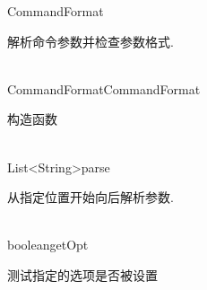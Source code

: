 \begin{XeClass}{CommandFormat}
   
 解析命令参数并检查参数格式.

  \begin{XeMethod}{\XePublic\\ }{CommandFormat}{CommandFormat}
       
 构造函数

  \end{XeMethod}

  \begin{XeMethod}{\XePublic\\ }{List<String>}{parse}
       
 从指定位置开始向后解析参数.

  \end{XeMethod}

  \begin{XeMethod}{\XePublic\\ }{boolean}{getOpt}
       
 测试指定的选项是否被设置

  \end{XeMethod}

\end{XeClass}

